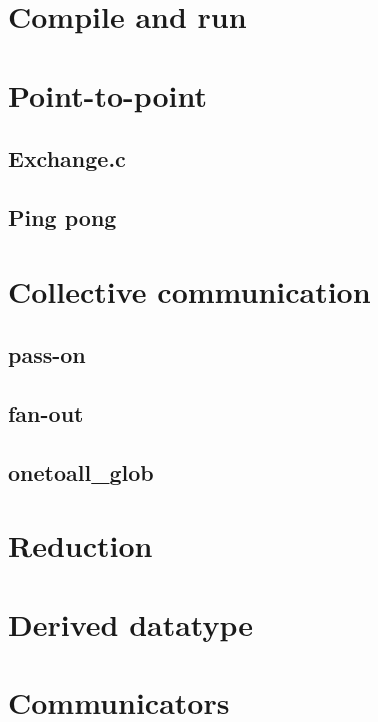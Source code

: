 \chapter{Compile and run}



\chapter{Point-to-point}

\section{Exchange.c}


\section{Ping pong}


\chapter{Collective communication}

\section{pass-on}


\section{fan-out}


\section{onetoall\_glob}


\chapter{Reduction}



\chapter{Derived datatype}



\chapter{Communicators}



